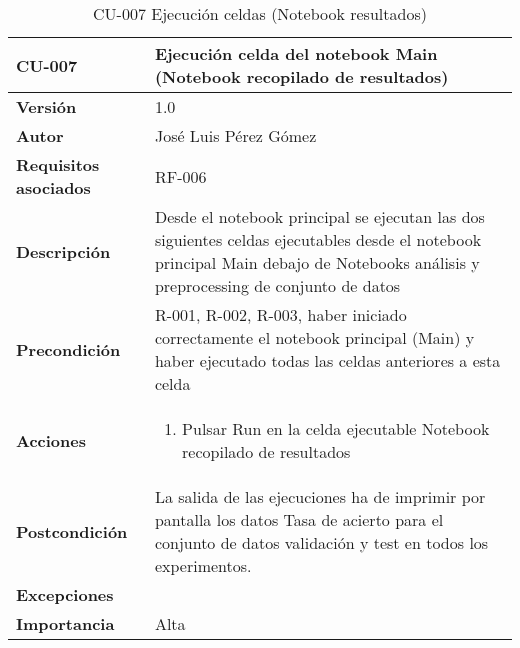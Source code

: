 \begin{table}[p]
	\centering
	\begin{tabularx}{\linewidth}{ p{} p{} }
		\toprule
		\textbf{CU-007}    & \textbf{Ejecución celda del notebook Main (Notebook recopilado de resultados)}\\
		\toprule
		\textbf{Versión}              & 1.0    \\
		\textbf{Autor}                & José Luis Pérez Gómez \\
		\textbf{Requisitos asociados} & RF-006 \\
		\textbf{Descripción}          & Desde el notebook principal se ejecutan las dos siguientes celdas ejecutables desde el notebook principal Main debajo de Notebooks análisis y preprocessing de conjunto de datos\\
		\textbf{Precondición}         & R-001, R-002, R-003, haber iniciado correctamente el notebook principal (Main) y haber ejecutado todas las celdas anteriores a esta celda\\
		\textbf{Acciones}             &
		\begin{enumerate}
			\def\labelenumi{\arabic{enumi}.}
			\tightlist
			\item Pulsar Run en la celda ejecutable Notebook recopilado de resultados			
		\end{enumerate}\\
		\textbf{Postcondición}        & La salida de las ejecuciones ha de imprimir por pantalla los datos Tasa de acierto para el conjunto de datos validación y test en todos los experimentos.\\
		\textbf{Excepciones}          &  \\
		\textbf{Importancia}          & Alta \\
		\bottomrule
	\end{tabularx}
	\caption{CU-007 Ejecución celdas (Notebook resultados)}
\end{table}